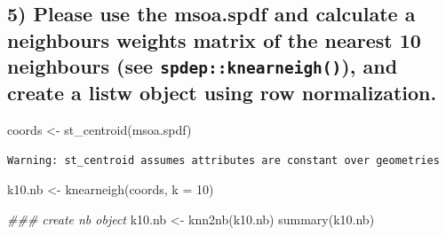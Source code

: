 \documentclass[
  letterpaper,
]{scrbook}
\newenvironment{Shaded}{\begin{snugshade}}{\end{snugshade}}
\newcommand{\AttributeTok}[1]{\textcolor[rgb]{0.40,0.45,0.13}{#1}}
\newcommand{\DecValTok}[1]{\textcolor[rgb]{0.68,0.00,0.00}{#1}}
\newcommand{\DocumentationTok}[1]{\textcolor[rgb]{0.37,0.37,0.37}{\textit{#1}}}
\newcommand{\FunctionTok}[1]{\textcolor[rgb]{0.28,0.35,0.67}{#1}}
\newcommand{\NormalTok}[1]{\textcolor[rgb]{0.00,0.23,0.31}{#1}}
\newcommand{\OtherTok}[1]{\textcolor[rgb]{0.00,0.23,0.31}{#1}}
\begin{document}
\hypertarget{please-use-the-msoa.spdf-and-calculate-a-neighbours-weights-matrix-of-the-nearest-10-neighbours-see-spdepknearneigh-and-create-a-listw-object-using-row-normalization.-1}{%
\subsection*{\texorpdfstring{5) Please use the msoa.spdf and calculate a
neighbours weights matrix of the nearest 10 neighbours (see
\texttt{spdep::knearneigh()}), and create a listw object using row
normalization.}{5) Please use the msoa.spdf and calculate a neighbours weights matrix of the nearest 10 neighbours (see spdep::knearneigh()), and create a listw object using row normalization.}}\label{please-use-the-msoa.spdf-and-calculate-a-neighbours-weights-matrix-of-the-nearest-10-neighbours-see-spdepknearneigh-and-create-a-listw-object-using-row-normalization.-1}}

\begin{Shaded}
\begin{Highlighting}[]
\NormalTok{coords }\OtherTok{\textless{}{-}} \FunctionTok{st\_centroid}\NormalTok{(msoa.spdf)}
\end{Highlighting}
\end{Shaded}

\begin{verbatim}
Warning: st_centroid assumes attributes are constant over geometries
\end{verbatim}

\begin{Shaded}
\begin{Highlighting}[]
\NormalTok{k10.nb }\OtherTok{\textless{}{-}} \FunctionTok{knearneigh}\NormalTok{(coords, }\AttributeTok{k =} \DecValTok{10}\NormalTok{)}

\DocumentationTok{\#\#\# create nb object}
\NormalTok{k10.nb }\OtherTok{\textless{}{-}} \FunctionTok{knn2nb}\NormalTok{(k10.nb)}
\FunctionTok{summary}\NormalTok{(k10.nb)}
\end{Highlighting}
\end{Shaded}
\end{document}
